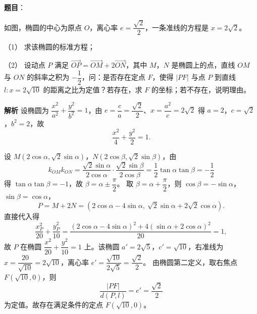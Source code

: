 \begin{answer}

\textbf{题目}：

如图，椭圆的中心为原点 $O$，离心率 $e=\dfrac{\sqrt2}2$，一条准线的方程是 $x=2\sqrt2$。

（1） 求该椭圆的标准方程；

（2） 设动点 $P$ 满足 $\overrightarrow{OP}=\overrightarrow{OM}+2\overrightarrow{ON}$，其中 $M$，$N$ 是椭圆上的点，直线 $OM$ 与 $ON$ 的斜率之积为 $-\dfrac12$，问：是否存在定点 $F$，使得 $|PF|$ 与点 $P$ 到直线 $l:x=2\sqrt{10}$ 的距离之比为定值？若存在，求 $F$ 的坐标；若不存在，说明理由。
\nopagebreak[4]
\begin{center}\end{center}
\nopagebreak[4]
\textbf{解析}
设椭圆为 $\dfrac{x^2}{a^2}+\dfrac{y^2}{b^2}=1$，由 $e=\dfrac ca=\dfrac{\sqrt2}2$、$x=\dfrac{a^2}c=2\sqrt2$ 得 $a=2$，$c=\sqrt2$，$b^2=2$，故
\nopagebreak[4]
\[\frac{x^2}4+\frac{y^2}2=1.\]

设 $M(2\cos\alpha,\sqrt2\sin\alpha)$，$N(2\cos\beta,\sqrt2\sin\beta)$，由
\nopagebreak[4]
\[k_{OM}k_{ON}=\frac{\sqrt2\sin\alpha}{2\cos\alpha}\cdot\frac{\sqrt2\sin\beta}{2\cos\beta}=\frac12\tan\alpha\tan\beta=-\frac12\]
得 $\tan\alpha\tan\beta=-1$，故 $\beta=\alpha\pm\dfrac\pi2$。
取 $\beta=\alpha+\dfrac\pi2$，则 $\cos\beta=-\sin\alpha$，$\sin\beta=\cos\alpha$，
\nopagebreak[4]
\[P=M+2N=(2\cos\alpha-4\sin\alpha,\ \sqrt2\sin\alpha+2\sqrt2\cos\alpha).\]
直接代入得
\nopagebreak[4]
\[\frac{x_P^2}{20}+\frac{y_P^2}{10}=\frac{(2\cos\alpha-4\sin\alpha)^2+4(\sin\alpha+2\cos\alpha)^2}{20}=1,\]
故 $P$ 在椭圆 $\dfrac{x^2}{20}+\dfrac{y^2}{10}=1$ 上。该椭圆 $a'=2\sqrt5$，$c'=\sqrt{10}$，右准线为 $x=\dfrac{20}{\sqrt{10}}=2\sqrt{10}$，离心率 $e'=\dfrac{\sqrt{10}}{2\sqrt5}=\dfrac{\sqrt2}2$。
由椭圆第二定义，取右焦点 $F(\sqrt{10},0)$，则
\nopagebreak[4]
\[\frac{|PF|}{d(P,l)}=e'=\frac{\sqrt2}2\]
为定值。故存在满足条件的定点 $F(\sqrt{10},0)$。



\end{answer}